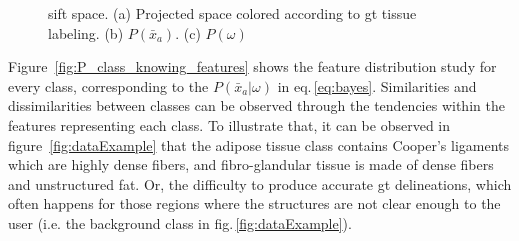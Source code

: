 \documentclass[a4paper, 10pt, conference]{llncs}      %
\begin{document}
\begin{figure}[Htbp]
{\begin{tikzpicture}
\end{tikzpicture}}

\caption{\acs{sift} space. (a) Projected space colored according to \acs{gt} tissue labeling. (b) $P(\bar{x}_a)$. (c) $P(\omega)$}
\label{fig:siftMapping}
\end{figure}



Figure~\ref{fig:P_class_knowing_features} shows the feature distribution study for every class, corresponding to the $P(\bar{x}_a|\omega)$ in eq.\,\ref{eq:bayes}. 
Similarities and dissimilarities between classes can be observed through the tendencies within the features representing each class.
To illustrate that, it can be observed in figure~\ref{fig:dataExample} that
the adipose tissue class contains Cooper's ligaments which are highly dense fibers, and fibro-glandular tissue is made of dense fibers and unstructured fat. Or, the difficulty to produce accurate \ac{gt} delineations, 
which often happens for those regions where the structures are not clear enough to the user (i.e. the background class in fig.\,\ref{fig:dataExample}).
%
\end{document}
